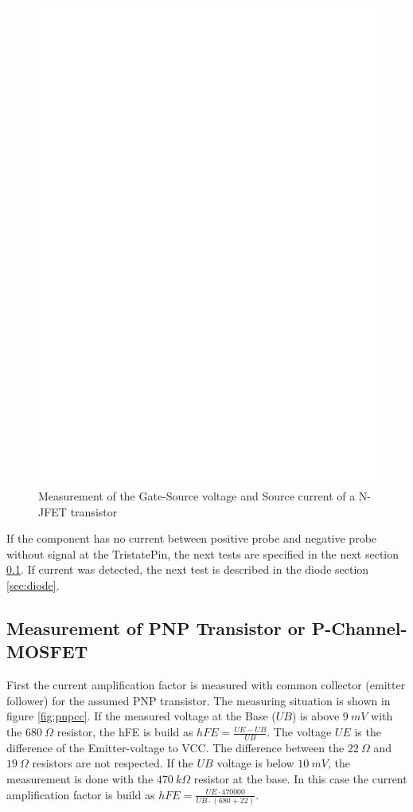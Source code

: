 \begin{figure}[H]
\centering
\includegraphics[]{../FIG/JFETcd.eps}
\caption{Measurement of the  Gate-Source voltage and Source current of a N-JFET transistor}
\label{fig:JFETcd}
\end{figure}

If the component has no current between positive probe and negative probe without signal at the
TristatePin, the next tests are specified in the next section \ref{sec:pnp}.
If current was detected, the next test is described in the diode section \ref{sec:diode}.

\subsection{Measurement of PNP Transistor or P-Channel-MOSFET}
\label{sec:pnp}
First the current amplification factor is measured with common collector (emitter follower) for the assumed
PNP transistor.
The measuring situation is shown in figure \ref{fig:pnpcc}.
If the measured voltage at the Base (\(UB\)) is above \(9~mV\) with the \(680~\Omega\) resistor,
the hFE is build as \(hFE = \frac{UE-UB}{UB}\).
The voltage \(UE\) is the difference of the Emitter-voltage to VCC.
The difference between the \(22~\Omega\) and \(19~\Omega\) resistors are not respected.
If the \(UB\) voltage is below \(10~mV\), the measurement is done with the \(470~k\Omega\) resistor at the base.
In this case the current amplification factor is build as \(hFE = \frac{UE \cdot 470000}{UB \cdot (680+22)}\).


